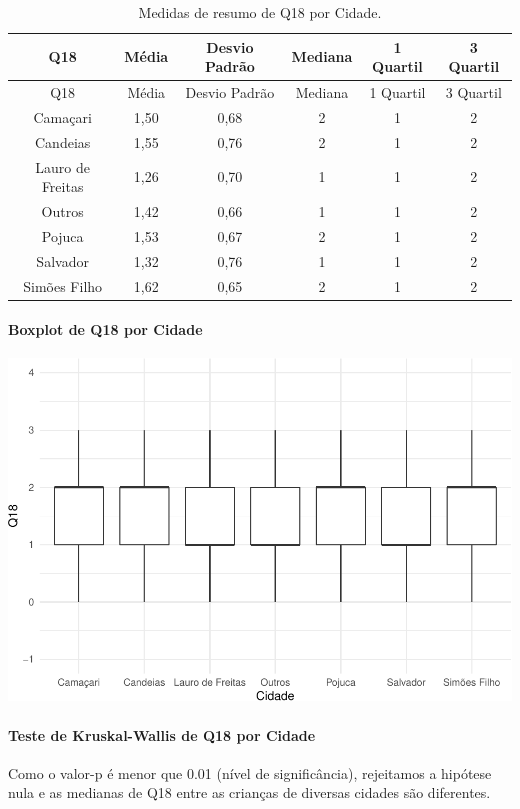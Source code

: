 \documentclass[]{article}
\let\oldparagraph\paragraph
\renewcommand{\paragraph}[1]{\oldparagraph{#1}\mbox{}}
\begin{document}
\begin{longtable}[]{@{}cccccc@{}}
\caption{\label{tab:unnamed-chunk-252}Medidas de resumo de Q18 por Cidade.}\tabularnewline
\toprule
Q18 & Média & Desvio Padrão & Mediana & 1 Quartil & 3 Quartil\tabularnewline
\midrule
\endfirsthead
\toprule
Q18 & Média & Desvio Padrão & Mediana & 1 Quartil & 3 Quartil\tabularnewline
\midrule
\endhead
Camaçari & 1,50 & 0,68 & 2 & 1 & 2\tabularnewline
Candeias & 1,55 & 0,76 & 2 & 1 & 2\tabularnewline
Lauro de Freitas & 1,26 & 0,70 & 1 & 1 & 2\tabularnewline
Outros & 1,42 & 0,66 & 1 & 1 & 2\tabularnewline
Pojuca & 1,53 & 0,67 & 2 & 1 & 2\tabularnewline
Salvador & 1,32 & 0,76 & 1 & 1 & 2\tabularnewline
Simões Filho & 1,62 & 0,65 & 2 & 1 & 2\tabularnewline
\bottomrule
\end{longtable}

\hypertarget{boxplot-de-q18-por-cidade}{%
\paragraph{Boxplot de Q18 por Cidade}\label{boxplot-de-q18-por-cidade}}

\begin{center}\includegraphics[width=0.75\linewidth]{relatorio_covid19_files/figure-latex/unnamed-chunk-253-1} \end{center}

\hypertarget{teste-de-kruskal-wallis-de-q18-por-cidade}{%
\paragraph{Teste de Kruskal-Wallis de Q18 por Cidade}\label{teste-de-kruskal-wallis-de-q18-por-cidade}}

Como o valor-p é menor que 0.01 (nível de significância), rejeitamos a hipótese nula e as medianas de Q18 entre as crianças de diversas cidades são diferentes.
\end{document}

